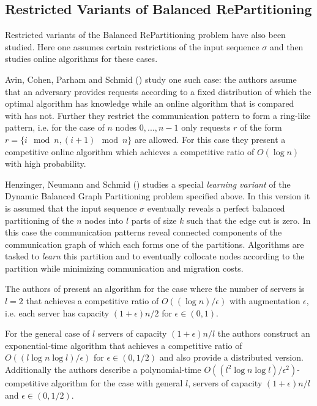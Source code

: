 \documentclass[a4paper,xcolor=dvipsnames, tikz, 12pt]{article}
\newcommand{\opt}{\text{O{\scriptsize PT}}}
\theoremstyle{definition}
\begin{document}
	
	\subsection{Restricted Variants of Balanced RePartitioning}
	Restricted variants of the Balanced RePartitioning problem have also been studied. Here one assumes certain restrictions of the input sequence $\sigma$ and then studies online algorithms for these cases. 
	
	Avin, Cohen, Parham and Schmid (\cite{Avin2018}) study one such case: the authors assume that an adversary provides requests according to a fixed distribution of which the optimal algorithm \opt{} has knowledge while an online algorithm that is compared with \opt{} has not. Further they restrict the communication pattern to form a ring-like pattern, i.e. for the case of $n$ nodes $0,...,n-1$ only requests $r$ of the form $r=\{i \mod n, (i+1)\mod n\}$ are allowed. For this case they present a competitive online algorithm which achieves a competitive ratio of $O(\log n)$ with high probability.	
	
	Henzinger, Neumann and Schmid (\cite{Henzinger2019}) studies a special \textit{learning variant} of the Dynamic Balanced Graph Partitioning problem specified above. In this version it is assumed that the input sequence $\sigma$ eventually reveals a perfect balanced partitioning of the $n$ nodes into $l$ parts of size $k$ such that the edge cut is zero. In this case the communication patterns reveal connected components of the communication graph of which each forms one of the partitions. Algorithms are tasked to \textit{learn} this partition and to eventually collocate nodes according to the partition while minimizing communication and migration costs.
	
	The authors of \cite{Henzinger2019} present an algorithm for the case where the number of servers is $l=2$ that achieves a competitive ratio of $O((\log n)/\epsilon)$ with augmentation $\epsilon$, i.e. each server has capacity $(1+\epsilon)n/2$ for $\epsilon\in(0,1)$.
	
	For the general case of $l$ servers of capacity $(1+\epsilon)n/l$ the authors construct an exponential-time algorithm that achieves a competitive ratio of $O((l\log n \log l)/\epsilon)$ for $\epsilon\in(0,1/2)$ and also provide a distributed version.
	Additionally the authors describe a polynomial-time $O((l^2\log n\log l)/\epsilon^2)$-competitive algorithm for the case with general $l$, servers of capacity $(1+\epsilon)n/l$ and $\epsilon\in(0,1/2)$.
	
\end{document}
